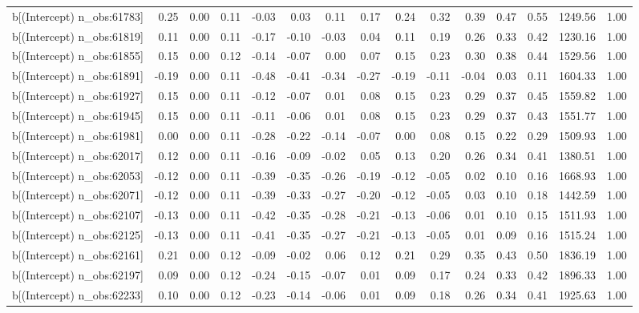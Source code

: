 \begin{table}[ht]
\begin{tabular}{rrrrrrrrrrrrrrr}
  b[(Intercept) n\_obs:61783] & 0.25 & 0.00 & 0.11 & -0.03 & 0.03 & 0.11 & 0.17 & 0.24 & 0.32 & 0.39 & 0.47 & 0.55 & 1249.56 & 1.00 \\ 
  b[(Intercept) n\_obs:61819] & 0.11 & 0.00 & 0.11 & -0.17 & -0.10 & -0.03 & 0.04 & 0.11 & 0.19 & 0.26 & 0.33 & 0.42 & 1230.16 & 1.00 \\ 
  b[(Intercept) n\_obs:61855] & 0.15 & 0.00 & 0.12 & -0.14 & -0.07 & 0.00 & 0.07 & 0.15 & 0.23 & 0.30 & 0.38 & 0.44 & 1529.56 & 1.00 \\ 
  b[(Intercept) n\_obs:61891] & -0.19 & 0.00 & 0.11 & -0.48 & -0.41 & -0.34 & -0.27 & -0.19 & -0.11 & -0.04 & 0.03 & 0.11 & 1604.33 & 1.00 \\ 
  b[(Intercept) n\_obs:61927] & 0.15 & 0.00 & 0.11 & -0.12 & -0.07 & 0.01 & 0.08 & 0.15 & 0.23 & 0.29 & 0.37 & 0.45 & 1559.82 & 1.00 \\ 
  b[(Intercept) n\_obs:61945] & 0.15 & 0.00 & 0.11 & -0.11 & -0.06 & 0.01 & 0.08 & 0.15 & 0.23 & 0.29 & 0.37 & 0.43 & 1551.77 & 1.00 \\ 
  b[(Intercept) n\_obs:61981] & 0.00 & 0.00 & 0.11 & -0.28 & -0.22 & -0.14 & -0.07 & 0.00 & 0.08 & 0.15 & 0.22 & 0.29 & 1509.93 & 1.00 \\ 
  b[(Intercept) n\_obs:62017] & 0.12 & 0.00 & 0.11 & -0.16 & -0.09 & -0.02 & 0.05 & 0.13 & 0.20 & 0.26 & 0.34 & 0.41 & 1380.51 & 1.00 \\ 
  b[(Intercept) n\_obs:62053] & -0.12 & 0.00 & 0.11 & -0.39 & -0.35 & -0.26 & -0.19 & -0.12 & -0.05 & 0.02 & 0.10 & 0.16 & 1668.93 & 1.00 \\ 
  b[(Intercept) n\_obs:62071] & -0.12 & 0.00 & 0.11 & -0.39 & -0.33 & -0.27 & -0.20 & -0.12 & -0.05 & 0.03 & 0.10 & 0.18 & 1442.59 & 1.00 \\ 
  b[(Intercept) n\_obs:62107] & -0.13 & 0.00 & 0.11 & -0.42 & -0.35 & -0.28 & -0.21 & -0.13 & -0.06 & 0.01 & 0.10 & 0.15 & 1511.93 & 1.00 \\ 
  b[(Intercept) n\_obs:62125] & -0.13 & 0.00 & 0.11 & -0.41 & -0.35 & -0.27 & -0.21 & -0.13 & -0.05 & 0.01 & 0.09 & 0.16 & 1515.24 & 1.00 \\ 
  b[(Intercept) n\_obs:62161] & 0.21 & 0.00 & 0.12 & -0.09 & -0.02 & 0.06 & 0.12 & 0.21 & 0.29 & 0.35 & 0.43 & 0.50 & 1836.19 & 1.00 \\ 
  b[(Intercept) n\_obs:62197] & 0.09 & 0.00 & 0.12 & -0.24 & -0.15 & -0.07 & 0.01 & 0.09 & 0.17 & 0.24 & 0.33 & 0.42 & 1896.33 & 1.00 \\ 
  b[(Intercept) n\_obs:62233] & 0.10 & 0.00 & 0.12 & -0.23 & -0.14 & -0.06 & 0.01 & 0.09 & 0.18 & 0.26 & 0.34 & 0.41 & 1925.63 & 1.00 \\ 

\end{tabular}
\end{table}
